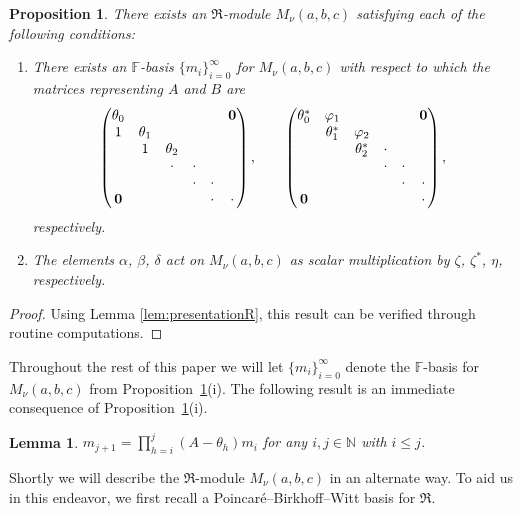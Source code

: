 \documentclass[pdftex]{sigma}
\def\N{\mathbb N}
\def\F{\mathbb F}
\numberwithin{equation}{section}
\newtheorem{Lemma}[Theorem]{Lemma}
\newtheorem{Proposition}[Theorem]{Proposition}
 { \theoremstyle{definition}
\newtheorem{Definition}[Theorem]{Definition}
\newtheorem{Example}[Theorem]{Example} }
\begin{document}
\begin{Proposition}\label{prop:Verma}There exists an $\Re$-module $M_\nu (a,b,c)$ satisfying each of the following conditions:
\begin{enumerate}\itemsep=0pt
\item[{\rm (i)}] There exists an $\F$-basis $\{m_i\}_{i=0}^\infty$ for $M_\nu (a,b,c)$ with respect to which the matrices representing $A$ and $B$ are
\begin{gather*}
\begin{pmatrix}
\theta_0 & & & & &{\bf 0}
\\
1 &\theta_1
\\
&1 &\theta_2
 \\
 & &\cdot &\cdot
 \\
& & &\cdot &\cdot
 \\
 {\bf 0} & & & &\cdot &\cdot
\end{pmatrix},
\qquad
\begin{pmatrix}
\theta_0^* &\varphi_1 & & & &{\bf 0}
\\
 &\theta_1^* &\varphi_2
\\
 & &\theta_2^* &\cdot
 \\
 & & &\cdot &\cdot
 \\
& & & &\cdot &\cdot
 \\
 {\bf 0} & & & & &\cdot
\end{pmatrix},
\end{gather*}
respectively.

\item[{\rm (ii)}] The elements $\alpha$, $\beta$, $\delta$ act on $M_\nu (a,b,c)$ as scalar multiplication by $\zeta$, $\zeta^*$, $\eta$, respectively.
\end{enumerate}
\end{Proposition}
\begin{proof}Using Lemma \ref{lem:presentationR}, this result can be verified through routine computations.
\end{proof}

Throughout the rest of this paper we will let $\{m_i\}_{i=0}^\infty$ denote the $\F$-basis for $M_\nu(a,b,c)$ from Proposition~\ref{prop:Verma}(i). The following result is an immediate consequence of Proposition~\ref{prop:Verma}(i).

\begin{Lemma}\label{lem:mi}$m_{j+1}=\prod\limits_{h=i}^j (A-\theta_h)m_i$ for any $i,j\in \N$ with $ i\leq j$.
\end{Lemma}

Shortly we will describe the $\Re$-module $M_\nu(a,b,c)$ in an alternate way. To aid us in this endeavor, we first recall a Poincar\'{e}--Birkhoff--Witt basis for $\Re$.
\end{document}
